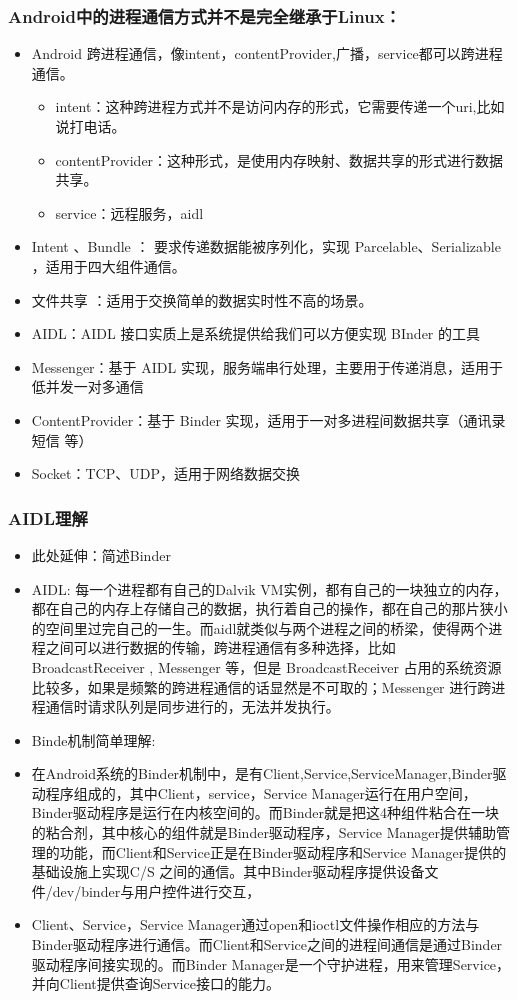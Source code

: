 \documentclass[9pt, b5paper]{article}
\begin{document}
\subsubsection{Android中的进程通信方式并不是完全继承于Linux：}
\label{sec-3-2-2}
\begin{itemize}
\item Android 跨进程通信，像intent，contentProvider,广播，service都可以跨进程通信。
\begin{itemize}
\item intent：这种跨进程方式并不是访问内存的形式，它需要传递一个uri,比如说打电话。
\item contentProvider：这种形式，是使用内存映射、数据共享的形式进行数据共享。
\item service：远程服务，aidl
\end{itemize}
\item Intent 、Bundle ： 要求传递数据能被序列化，实现 Parcelable、Serializable ，适用于四大组件通信。
\item 文件共享 ：适用于交换简单的数据实时性不高的场景。
\item AIDL：AIDL 接口实质上是系统提供给我们可以方便实现 BInder 的工具
\item Messenger：基于 AIDL 实现，服务端串行处理，主要用于传递消息，适用于低并发一对多通信
\item ContentProvider：基于 Binder 实现，适用于一对多进程间数据共享（通讯录 短信 等）
\item Socket：TCP、UDP，适用于网络数据交换
\end{itemize}
\subsubsection{AIDL理解}
\label{sec-3-2-3}
\begin{itemize}
\item 此处延伸：简述Binder
\item AIDL: 每一个进程都有自己的Dalvik VM实例，都有自己的一块独立的内存，都在自己的内存上存储自己的数据，执行着自己的操作，都在自己的那片狭小的空间里过完自己的一生。而aidl就类似与两个进程之间的桥梁，使得两个进程之间可以进行数据的传输，跨进程通信有多种选择，比如 BroadcastReceiver , Messenger 等，但是 BroadcastReceiver 占用的系统资源比较多，如果是频繁的跨进程通信的话显然是不可取的；Messenger 进行跨进程通信时请求队列是同步进行的，无法并发执行。
\item Binde机制简单理解:
\item 在Android系统的Binder机制中，是有Client,Service,ServiceManager,Binder驱动程序组成的，其中Client，service，Service Manager运行在用户空间，Binder驱动程序是运行在内核空间的。而Binder就是把这4种组件粘合在一块的粘合剂，其中核心的组件就是Binder驱动程序，Service Manager提供辅助管理的功能，而Client和Service正是在Binder驱动程序和Service Manager提供的基础设施上实现C/S 之间的通信。其中Binder驱动程序提供设备文件/dev/binder与用户控件进行交互，
\item Client、Service，Service Manager通过open和ioctl文件操作相应的方法与Binder驱动程序进行通信。而Client和Service之间的进程间通信是通过Binder驱动程序间接实现的。而Binder Manager是一个守护进程，用来管理Service，并向Client提供查询Service接口的能力。
\end{itemize}
\end{document}
